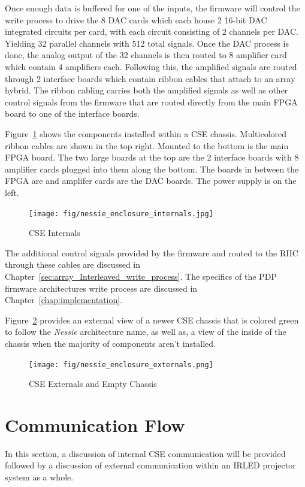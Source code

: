     Once enough data is buffered for one of the inputs, the firmware will control the write process to drive the 8 DAC cards which each house 2 16-bit DAC integrated circuits per card, with each circuit consisting of 2 channels per DAC. Yielding 32 parallel channels with 512 total signals. Once the DAC process is done, the analog output of the 32 channels is then routed to 8 amplifier card which contain 4 amplifiers each. Following this, the amplified signals are routed through 2 interface boards which contain ribbon cables that attach to an array hybrid. The ribbon cabling carries both the amplified signals as well as other control signals from the firmware that are routed directly from the main FPGA board to one of the interface boards.

    Figure~\ref{fig:nessie_enclosure_internals} shows the components installed within a CSE chassis. Multicolored ribbon cables are shown in the top right. Mounted to the bottom is the main FPGA board. The two large boards at the top are the 2 interface boards with 8 amplifier cards plugged into them along the bottom. The boards in between the FPGA are and amplifer cards are the DAC boards. The power supply is on the left.

    \begin{figure}
        \centering
        \texttt{[image: fig/nessie\_enclosure\_internals.jpg]}
        \caption{CSE Internals}
        \label{fig:nessie_enclosure_internals}
    \end{figure}

    The additional control signals provided by the firmware and routed to the RIIC through these cables are discussed in Chapter~\ref{sec:array_Interleaved_write_process}. The specifics of the PDP firmware architectures write process are discussed in Chapter~\ref{chap:implementation}.

    Figure~\ref{fig:nessie_enclosure_externals} provides an external view of a newer CSE chassis that is colored green to follow the {\it Nessie} architecture name, as well as, a view of the inside of the chassis when the majority of components aren't installed.

    \begin{figure}
        \centering
        \texttt{[image: fig/nessie\_enclosure\_externals.png]}
        \caption{CSE Externals and Empty Chassis}
        \label{fig:nessie_enclosure_externals}
    \end{figure}

\section{Communication Flow}
    In this section, a discussion of internal CSE communication will be provided followed by a discussion of external communication within an IRLED projector system as a whole.

